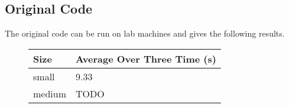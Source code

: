 \subsection*{Original Code}
The original code can be run on lab machines and gives the following results.\\
\begin{figure}[H]\centering \begin{tabular}{ l | l }
  \hline
  Size & Average Over Three Time (s) \\
  \hline
  \hline
  small & 9.33 \\
  medium & TODO \\
  \hline
\end{tabular} \end{figure}
